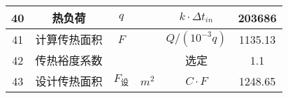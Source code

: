 \begin{table}[H]
{\begin{tabular}{|c|c|c|c|c|c|}
            40   & 热负荷           & $ q $               &           & $ k \cdot \Delta t_{in}$                                                                           & 203686           \\ \hline
            41   & 计算传热面积     & $ F $               &           & $ Q/(10^{-3}q) $                                                                                   & 1135.13          \\ \hline
            42   & 传热裕度系数     &                     &           & 选定                                                                                               & 1.1              \\ \hline
            43   & 设计传热面积     & $ F_{\text{设}} $   & $ m^2 $   & $ C \cdot F $                                                                                      & 1248.65          \\ \hline
        \end{tabular}
    }
\end{table}

